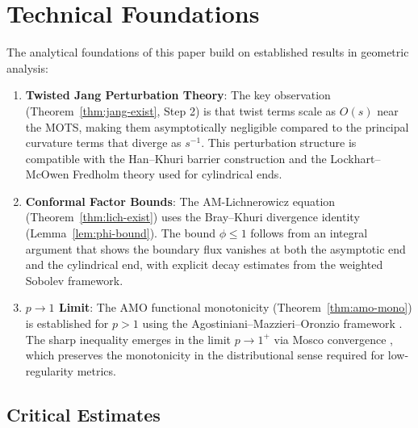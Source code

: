\documentclass[12pt]{article}
\theoremstyle{plain}
\theoremstyle{definition}
\theoremstyle{remark}
\begin{document}

\section{Technical Foundations}\label{app:technical}

The analytical foundations of this paper build on established results in geometric analysis:

\begin{enumerate}
    \item \textbf{Twisted Jang Perturbation Theory}: The key observation (Theorem~\ref{thm:jang-exist}, Step 2) is that twist terms scale as $O(s)$ near the MOTS, making them asymptotically negligible compared to the principal curvature terms that diverge as $s^{-1}$. This perturbation structure is compatible with the Han--Khuri barrier construction \cite{hankhuri2013} and the Lockhart--McOwen Fredholm theory \cite{lockhartmccowen1985} used for cylindrical ends.
    
    \item \textbf{Conformal Factor Bounds}: The AM-Lichnerowicz equation (Theorem~\ref{thm:lich-exist}) uses the Bray--Khuri divergence identity (Lemma~\ref{lem:phi-bound}). The bound $\phi \leq 1$ follows from an integral argument that shows the boundary flux vanishes at both the asymptotic end and the cylindrical end, with explicit decay estimates from the weighted Sobolev framework.
    
    \item \textbf{$p \to 1$ Limit}: The AMO functional monotonicity (Theorem~\ref{thm:amo-mono}) is established for $p > 1$ using the Agostiniani--Mazzieri--Oronzio framework \cite{amo2022}. The sharp inequality emerges in the limit $p \to 1^+$ via Mosco convergence \cite{mosco1969}, which preserves the monotonicity in the distributional sense required for low-regularity metrics.
\end{enumerate}

\subsection{Critical Estimates}\label{subsec:critical-estimates-appendix}
\end{document}
